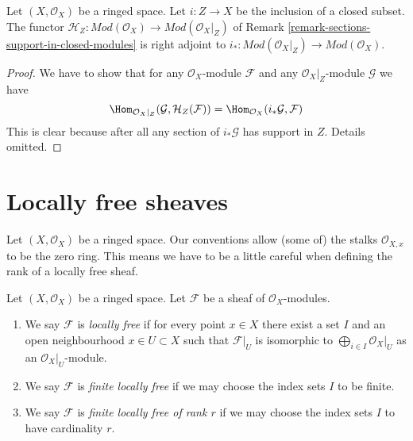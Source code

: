 \begin{lemma}
\label{lemma-adjoint-section-with-support}
Let $(X, \mathcal{O}_X)$ be a ringed space. Let $i : Z \to X$ be the
inclusion of a closed subset. The functor
$\mathcal{H}_Z : \textit{Mod}(\mathcal{O}_X) \to
\textit{Mod}(\mathcal{O}_X|_Z)$ of
Remark \ref{remark-sections-support-in-closed-modules}
is right adjoint to
$i_* : \textit{Mod}(\mathcal{O}_X|_Z) \to \textit{Mod}(\mathcal{O}_X)$.
\end{lemma}

\begin{proof}
We have to show that for any $\mathcal{O}_X$-module $\mathcal{F}$
and any $\mathcal{O}_X|_Z$-module $\mathcal{G}$ we have
$$
\Hom_{\mathcal{O}_X|_Z}(\mathcal{G}, \mathcal{H}_Z(\mathcal{F})) =
\Hom_{\mathcal{O}_X}(i_*\mathcal{G}, \mathcal{F})
$$
This is clear
because after all any section of $i_*\mathcal{G}$ has support in $Z$.
Details omitted.
\end{proof}










\section{Locally free sheaves}
\label{section-locally-free}

\noindent
Let $(X, \mathcal{O}_X)$ be a ringed space.
Our conventions allow (some of) the stalks $\mathcal{O}_{X, x}$
to be the zero ring. This means we have to be a little careful
when defining the rank of a locally free sheaf.

\begin{definition}
\label{definition-locally-free}
Let $(X, \mathcal{O}_X)$ be a ringed space.
Let $\mathcal{F}$ be a sheaf of $\mathcal{O}_X$-modules.
\begin{enumerate}
\item We say $\mathcal{F}$ is {\it locally free} if for every
point $x \in X$ there exist a set $I$ and an open
neighbourhood $x \in U \subset X$
such that $\mathcal{F}|_U$ is isomorphic to
$\bigoplus_{i \in I} \mathcal{O}_X|_U$ as an $\mathcal{O}_X|_U$-module.
\item We say $\mathcal{F}$ is {\it finite locally free} if we may
choose the index sets $I$ to be finite.
\item We say $\mathcal{F}$ is {\it finite locally free of rank $r$}
if we may choose the index sets $I$ to have cardinality $r$.
\end{enumerate}
\end{definition}

